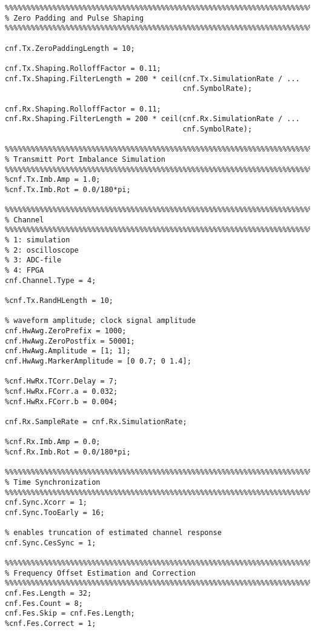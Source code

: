 \begin{appendix}
\begin{verbatim}
%%%%%%%%%%%%%%%%%%%%%%%%%%%%%%%%%%%%%%%%%%%%%%%%%%%%%%%%%%%%%%%%%%%%%%%%%%%%%%%%
% Zero Padding and Pulse Shaping
%%%%%%%%%%%%%%%%%%%%%%%%%%%%%%%%%%%%%%%%%%%%%%%%%%%%%%%%%%%%%%%%%%%%%%%%%%%%%%%%

cnf.Tx.ZeroPaddingLength = 10;

cnf.Tx.Shaping.RolloffFactor = 0.11;
cnf.Tx.Shaping.FilterLength = 200 * ceil(cnf.Tx.SimulationRate / ...
                                         cnf.SymbolRate);

cnf.Rx.Shaping.RolloffFactor = 0.11;
cnf.Rx.Shaping.FilterLength = 200 * ceil(cnf.Rx.SimulationRate / ...
                                         cnf.SymbolRate);

%%%%%%%%%%%%%%%%%%%%%%%%%%%%%%%%%%%%%%%%%%%%%%%%%%%%%%%%%%%%%%%%%%%%%%%%%%%%%%%%
% Transmitt Port Imbalance Simulation
%%%%%%%%%%%%%%%%%%%%%%%%%%%%%%%%%%%%%%%%%%%%%%%%%%%%%%%%%%%%%%%%%%%%%%%%%%%%%%%%
%cnf.Tx.Imb.Amp = 1.0;
%cnf.Tx.Imb.Rot = 0.0/180*pi;

%%%%%%%%%%%%%%%%%%%%%%%%%%%%%%%%%%%%%%%%%%%%%%%%%%%%%%%%%%%%%%%%%%%%%%%%%%%%%%%%
% Channel
%%%%%%%%%%%%%%%%%%%%%%%%%%%%%%%%%%%%%%%%%%%%%%%%%%%%%%%%%%%%%%%%%%%%%%%%%%%%%%%%
% 1: simulation
% 2: oscilloscope
% 3: ADC-file
% 4: FPGA
cnf.Channel.Type = 4;

%cnf.Tx.RandHLength = 10;

% waveform amplitude; clock signal amplitude
cnf.HwAwg.ZeroPrefix = 1000;
cnf.HwAwg.ZeroPostfix = 50001;
cnf.HwAwg.Amplitude = [1; 1];
cnf.HwAwg.MarkerAmplitude = [0 0.7; 0 1.4];

%cnf.HwRx.TCorr.Delay = 7;
%cnf.HwRx.FCorr.a = 0.032;
%cnf.HwRx.FCorr.b = 0.004;

cnf.Rx.SampleRate = cnf.Rx.SimulationRate;

%cnf.Rx.Imb.Amp = 0.0;
%cnf.Rx.Imb.Rot = 0.0/180*pi;

%%%%%%%%%%%%%%%%%%%%%%%%%%%%%%%%%%%%%%%%%%%%%%%%%%%%%%%%%%%%%%%%%%%%%%%%%%%%%%%%
% Time Synchronization
%%%%%%%%%%%%%%%%%%%%%%%%%%%%%%%%%%%%%%%%%%%%%%%%%%%%%%%%%%%%%%%%%%%%%%%%%%%%%%%%
cnf.Sync.Xcorr = 1;
cnf.Sync.TooEarly = 16;

% enables truncation of estimated channel response
cnf.Sync.CesSync = 1;

%%%%%%%%%%%%%%%%%%%%%%%%%%%%%%%%%%%%%%%%%%%%%%%%%%%%%%%%%%%%%%%%%%%%%%%%%%%%%%%%
% Frequency Offset Estimation and Correction
%%%%%%%%%%%%%%%%%%%%%%%%%%%%%%%%%%%%%%%%%%%%%%%%%%%%%%%%%%%%%%%%%%%%%%%%%%%%%%%%
cnf.Fes.Length = 32;
cnf.Fes.Count = 8;
cnf.Fes.Skip = cnf.Fes.Length;
%cnf.Fes.Correct = 1;


\end{verbatim}
\end{appendix}

